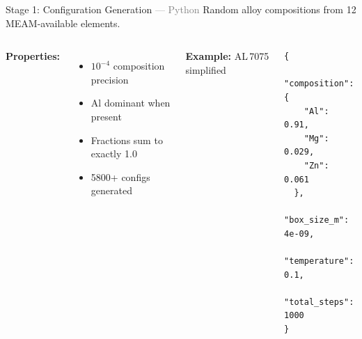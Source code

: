 \begin{frame}[fragile]{Stage 1: Configuration Generation \normalfont\small\textcolor{gray}{--- Python}}
Random alloy compositions from 12 MEAM-available elements.

\vspace{0.5em}
\begin{columns}[T]
\textbf{Properties:}
\begin{itemize}
  \item $10^{-4}$ composition precision
  \item Al dominant when present
  \item Fractions sum to exactly 1.0
  \item 5800+ configs generated
\end{itemize}

\textbf{Example:} AL\,7075 simplified
\begin{lstlisting}[language={}]
{
  "composition": {
    "Al": 0.91,
    "Mg": 0.029,
    "Zn": 0.061
  },
  "box_size_m": 4e-09,
  "temperature": 0.1,
  "total_steps": 1000
}
\end{lstlisting}
\end{columns}
\end{frame}
